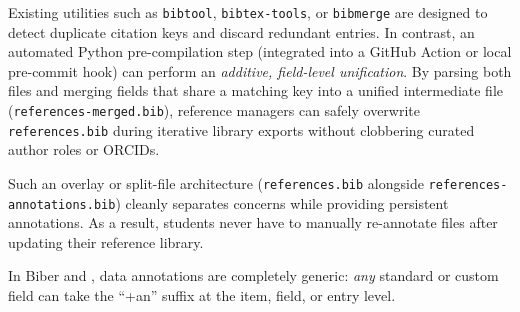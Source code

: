 \documentclass[12pt, twoside]{article}
\newcommand{\fname}[1]{\texttt{#1}}
\begin{document}
Existing utilities such as \texttt{bibtool}, \texttt{bibtex-tools}, or \texttt{bibmerge} are designed to detect duplicate citation keys and discard redundant entries. In contrast, an automated Python pre-compilation step (\eg integrated into a GitHub Action or local pre-commit hook) can perform an \emph{additive, field-level unification}. By parsing both files and merging fields that share a matching key into a unified intermediate file (\eg \fname{references-merged.bib}), reference managers can safely overwrite \fname{references.bib} during iterative library exports without clobbering curated author roles or \glspl{ORCID}.

Such an overlay or split-file architecture (\fname{references.bib} alongside \fname{references-annotations.bib}) cleanly separates concerns while providing persistent annotations. As a result, students never have to manually re-annotate files after updating their reference library.

In Biber and \BibLaTeX{}, data annotations are completely generic: \emph{any} standard or custom field can take the \enquote{+an} suffix at the item, field, or entry level.
\end{document}
